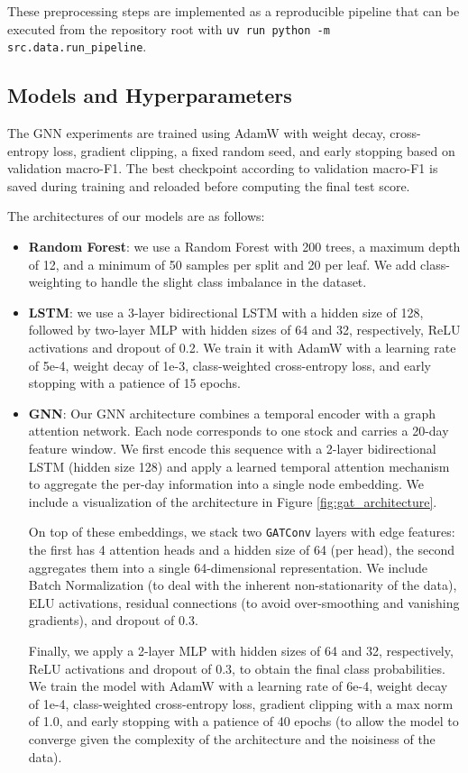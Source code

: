 \documentclass{article}
\begin{document}
These preprocessing steps are implemented as a reproducible pipeline that can be executed from the repository root with \texttt{uv run python -m src.data.run\_pipeline}.

\subsection{Models and Hyperparameters}

The GNN experiments are trained using AdamW with weight decay, cross-entropy loss, gradient clipping, a fixed random seed, and early stopping based on validation macro-F1. The best checkpoint according to validation macro-F1 is saved during training and reloaded before computing the final test score.

The architectures of our models are as follows:
\begin{itemize}
    \item \textbf{Random Forest}: we use a Random Forest with 200 trees, a maximum depth of 12, and a minimum of 50 samples per split and 20 per leaf. We add class-weighting to handle the slight class imbalance in the dataset.
    \item \textbf{LSTM}: we use a 3-layer bidirectional LSTM with a hidden size of 128, followed by two-layer MLP with hidden sizes of 64 and 32, respectively, ReLU activations and dropout of 0.2. We train it with AdamW with a learning rate of 5e-4, weight decay of 1e-3, class-weighted cross-entropy loss, and early stopping with a patience of 15 epochs.
    \item \textbf{GNN}: Our GNN architecture combines a temporal encoder with a graph attention network. Each node corresponds to one stock and carries a 20-day feature window. We first encode this sequence with a 2-layer bidirectional LSTM (hidden size 128) and apply a learned temporal attention mechanism to aggregate the per-day information into a single node embedding. We include a visualization of the architecture in Figure \ref{fig:gat_architecture}.

          On top of these embeddings, we stack two \texttt{GATConv} layers with edge features: the first has 4 attention heads and a hidden size of 64 (per head), the second aggregates them into a single 64-dimensional representation. We include Batch Normalization (to deal with the inherent non-stationarity of the data), ELU activations, residual connections (to avoid over-smoothing and vanishing gradients), and dropout of 0.3.

          Finally, we apply a 2-layer MLP with hidden sizes of 64 and 32, respectively, ReLU activations and dropout of 0.3, to obtain the final class probabilities. We train the model with AdamW with a learning rate of 6e-4, weight decay of 1e-4, class-weighted cross-entropy loss, gradient clipping with a max norm of 1.0, and early stopping with a patience of 40 epochs (to allow the model to converge given the complexity of the architecture and the noisiness of the data).
\end{itemize}
\end{document}
